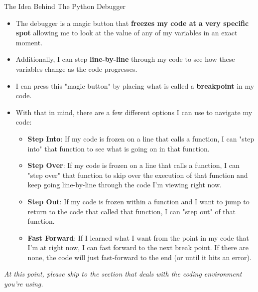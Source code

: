 \documentclass[10pt, aspectratio=169]{beamer}
\begin{document}
\begin{frame}{The Idea Behind The Python Debugger}
    \begin{itemize}
        \item The debugger is a magic button that \textbf{freezes my code at a very specific spot} allowing me to look at the value of any of my variables in an exact moment.
        \item Additionally, I can step \textbf{line-by-line} through my code to see how these variables change as the code progresses.
        \vspace{0.2cm}
        \item I can press this "magic button" by placing what is called a \textbf{breakpoint} in my code.
        \item With that in mind, there are a few different options I can use to navigate my code:
        \begin{itemize}
            \item \textbf{Step Into}: If my code is frozen on a line that calls a function, I can "step into" that function to see what is going on in that function.
            \item \textbf{Step Over}: If my code is frozen on a line that calls a function, I can "step over" that function to skip over the execution of that function and keep going line-by-line through the code I'm viewing right now.
            \item \textbf{Step Out}: If my code is frozen within a function and I want to jump to return to the code that called that function, I can "step out" of that function.
            \item \textbf{Fast Forward}: If I learned what I want from the point in my code that I'm at right now, I can fast forward to the next break point. If there are none, the code will just fast-forward to the end (or until it hits an error).
        \end{itemize}
    \end{itemize}

    \textit{At this point, please skip to the section that deals with the coding environment you're using.}
\end{frame}
\end{document}
